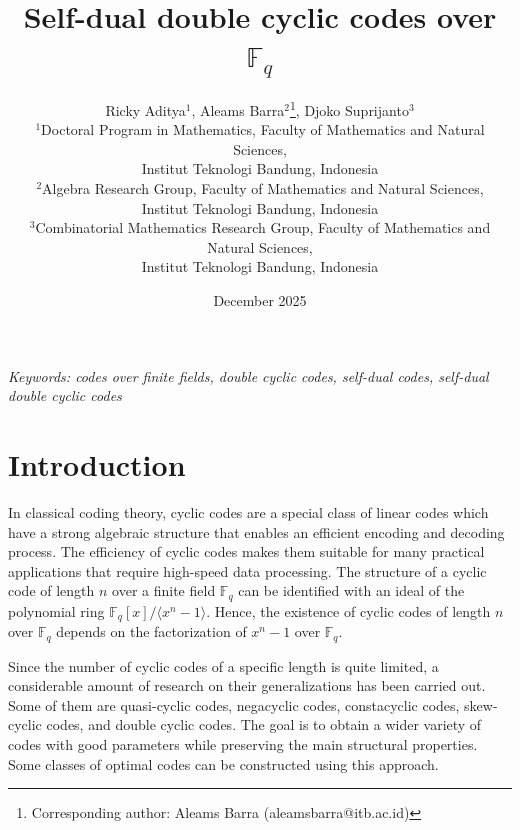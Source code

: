 \documentclass[12pt]{article}
\title{Self-dual double cyclic codes over $\mathbb{F}_q$}
\author{Ricky Aditya$^{1}$, Aleams Barra$^{2}$\thanks{Corresponding author: Aleams Barra (aleamsbarra@itb.ac.id)}, Djoko Suprijanto$^{3}$\\
	\small $^{1}$Doctoral Program in Mathematics, Faculty of Mathematics and Natural Sciences,\\ Institut Teknologi Bandung, Indonesia %
	\\ $^{2}$Algebra Research Group, Faculty of Mathematics and Natural Sciences,\\ Institut Teknologi Bandung, Indonesia %
	\\
	$^{3}$Combinatorial Mathematics Research Group, Faculty of Mathematics and Natural Sciences,\\ Institut Teknologi Bandung, Indonesia %
}
\date{December 2025}
\begin{document}
	\maketitle
	\setcounter{MaxMatrixCols}{20}
	
	
	{\it Keywords: codes over finite fields, double cyclic codes, self-dual codes, self-dual double cyclic codes}
	
	\section{Introduction}
	In classical coding theory, cyclic codes are a special class of linear codes which have a strong algebraic structure that enables an efficient encoding and decoding process. The efficiency of cyclic codes makes them suitable for many practical applications that require high-speed data processing. The structure of a cyclic code of length $n$ over a finite field $\mathbb{F}_q$ can be identified with an ideal of the polynomial ring $\mathbb{F}_q[x]/\langle x^n-1\rangle$. Hence, the existence of cyclic codes of length $n$ over $\mathbb{F}_q$ depends on the factorization of $x^n-1$ over $\mathbb{F}_q$.
	
	Since the number of cyclic codes of a specific length is quite limited, a considerable amount of research on their generalizations has been carried out. Some of them are quasi-cyclic codes, negacyclic codes, constacyclic codes, skew-cyclic codes, and double cyclic codes. The goal is to obtain a wider variety of codes with good parameters while preserving the main structural properties. Some classes of optimal codes can be constructed using this approach.
	
\end{document}
